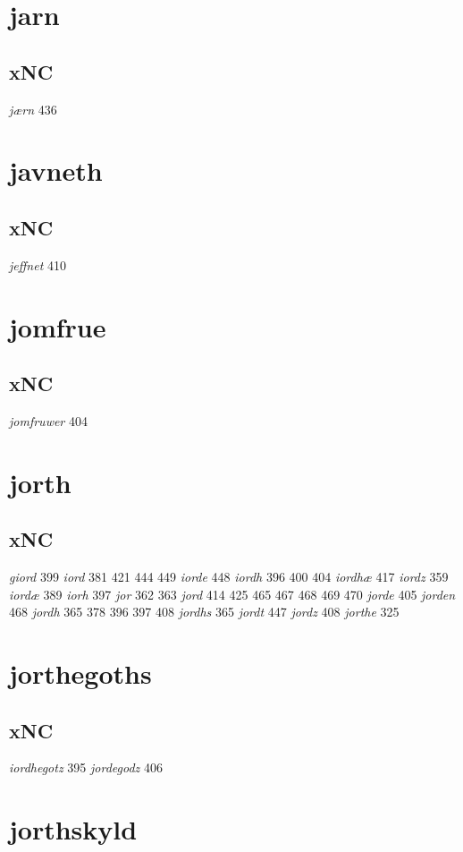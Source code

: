 \documentclass[a4paper,twocolumn]{article}
\begin{document}
\section{jarn}
\label{sec:org6c3bb03}
\subsection{xNC}
\label{sec:orgb2d9218}
\emph{jærn} 436 
\section{javneth}
\label{sec:orga2cdc20}
\subsection{xNC}
\label{sec:orgbeba28e}
\emph{jeffnet} 410 
\section{jomfrue}
\label{sec:org13e53cc}
\subsection{xNC}
\label{sec:orgc0e54fd}
\emph{jomfruwer} 404 
\section{jorth}
\label{sec:orge0e575f}
\subsection{xNC}
\label{sec:orgaa0e048}
\emph{giord} 399 \emph{iord} 381 421 444 449 \emph{iorde} 448 \emph{iordh} 396 400 404 \emph{iordhæ} 417 \emph{iordz} 359 \emph{iordæ} 389 \emph{iorh} 397 \emph{jor} 362 363 \emph{jord} 414 425 465 467 468 469 470 \emph{jorde} 405 \emph{jorden} 468 \emph{jordh} 365 378 396 397 408 \emph{jordhs} 365 \emph{jordt} 447 \emph{jordz} 408 \emph{jorthe} 325 
\section{jorthegoths}
\label{sec:org3a34385}
\subsection{xNC}
\label{sec:org9e6dcca}
\emph{iordhegotz} 395 \emph{jordegodz} 406 
\section{jorthskyld}
\label{sec:org7e6c6b2}
\end{document}
